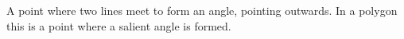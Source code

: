 A point where two lines meet to form an angle, pointing outwards.
In a polygon this is a point where a salient angle is formed.
